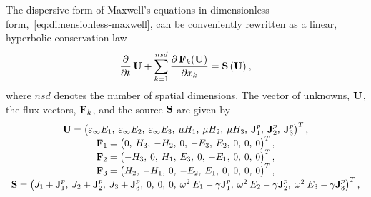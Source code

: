 The dispersive form of Maxwell's equations in dimensionless
form,~\eqref{eq:dimensionless-maxwell}, can be conveniently rewritten as a
linear, hyperbolic conservation law\cite{Godlewski:2013tj,LeVeque:2002vc}
\begin{equation}
  \frac{\partial}{\partial t}  \, \mathbf{U} + \sum_{k=1}^{nsd} \frac { \partial \, \mathbf{F}_k(\mathbf{U}) }{ \partial x_k } = \mathbf{S}\,(\mathbf{U}) \: ,
  \label{eq:maxwell-curl-equations-conservation-form}
\end{equation}
where $nsd$ denotes the number of spatial dimensions. The vector of unknowns,
$\mathbf{U}$, the flux vectors, $\mathbf{F}_k$, and the source $\mathbf{S}$ are
given by
\begin{equation*}
  \begin{array}{c}
    \mathbf{U} =
    \begin{pmatrix}
      \varepsilon_{\infty} E_1, \: \varepsilon_{\infty} E_2 , \: \varepsilon_{\infty} E_3 , \: \mu
      H_1 , \: \mu H_2 , \: \mu H_3 , \: \mathbf{J}^p_1 , \: \mathbf{J}^p_2 , \: \mathbf{J}^p_3
    \end{pmatrix}^T,
    \\
    \mathbf{F}_1 =
    \begin{pmatrix}
      0 ,\: H_3 ,\: -H_2 ,\: 0 ,\: -E_3 ,\: E_2 ,\: 0 ,\: 0 ,\: 0
    \end{pmatrix}^T , \\

    \mathbf{F}_2 =
    \begin{pmatrix}
      - H_3 ,\: 0 ,\: H_1 ,\: E_3 ,\: 0 ,\: -E_1 ,\: 0 ,\: 0 ,\: 0
    \end{pmatrix}^T , \\

    \mathbf{F}_3 =
    \begin{pmatrix}
      H_2 ,\: -H_1 ,\: 0 ,\: -E_2 ,\: E_1 ,\: 0 ,\: 0 ,\: 0 ,\: 0
    \end{pmatrix}^T , \\

    \mathbf{S} =
    \begin{pmatrix}
      J_1 + \mathbf{J}^p_1 ,\: J_2 + \mathbf{J}^p_2 ,\: J_3 + \mathbf{J}^p_3 ,\: 0 ,\: 0 ,\: 0 ,\: \omega^2
      \: E_1 - \gamma \mathbf{J}^p_1 ,\: \omega^2 \: E_2 - \gamma \mathbf{J}^p_2 ,\: \omega^2 \:
      E_3 - \gamma \mathbf{J}^p_3
    \end{pmatrix}^T,

  \end{array}
\end{equation*}

